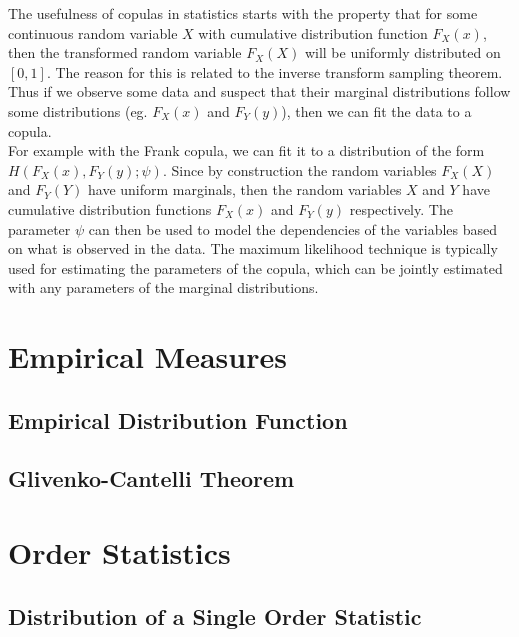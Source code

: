 \documentclass[11pt]{report} %
\begin{document}
The usefulness of copulas in statistics starts with the property that for some continuous random variable $X$ with cumulative distribution function $F_{X}\left(x\right)$, then the transformed random variable $F_{X}\left(X\right)$ will be uniformly distributed on $\left[0, 1\right]$. The reason for this is related to the inverse transform sampling theorem. Thus if we observe some data and suspect that their marginal distributions follow some distributions (eg. $F_{X}\left(x\right)$ and $F_{Y}\left(y\right)$), then we can fit the data to a copula. \\

For example with the Frank copula, we can fit it to a distribution of the form $H\left(F_{X}\left(x\right), F_{Y}\left(y\right); \psi\right)$. Since by construction the random variables $F_{X}\left(X\right)$ and $F_{Y}\left(Y\right)$ have uniform marginals, then the random variables $X$ and $Y$ have cumulative distribution functions $F_{X}\left(x\right)$ and $F_{Y}\left(y\right)$ respectively. The parameter $\psi$ can then be used to model the dependencies of the variables based on what is observed in the data. The maximum likelihood technique is typically used for estimating the parameters of the copula, which can be jointly estimated with any parameters of the marginal distributions.

\section{Empirical Measures}

\subsection{Empirical Distribution Function}

\subsection{Glivenko-Cantelli Theorem}

\section{Order Statistics}

\subsection{Distribution of a Single Order Statistic}
\end{document}
